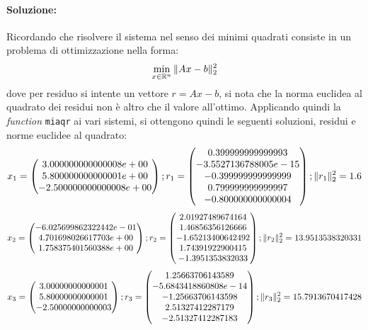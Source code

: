\documentclass[12pt]{article}
\begin{document}
\paragraph{Soluzione:}
Ricordando che risolvere il sistema nel senso dei minimi quadrati consiste in un problema di ottimizzazione nella forma:
$$\min_{x \in \mathbb{R}^n}\Arrowvert Ax-b \Arrowvert_{2}^2$$
dove per residuo si intente un vettore  \(r=Ax-b\), si nota che la norma euclidea al quadrato dei residui non è altro che il valore all'ottimo. 
Applicando quindi la \textit{function} \texttt{miaqr} ai vari sistemi, si ottengono quindi le seguenti soluzioni, residui e norme euclidee al quadrato:
\begin{equation*} x_1=
    \begin{pmatrix}
        3.000000000000008e+00\\
        5.800000000000001e+00\\
        -2.500000000000008e+00
    \end{pmatrix}
    ;  r_1=
    \begin{pmatrix}
        0.399999999999993\\
        -3.5527136788005e-15\\
        -0.399999999999999\\
        0.799999999999997\\
        -0.800000000000004
    \end{pmatrix}
    ;  \Arrowvert r_1 \Arrowvert_{2}^2 = 1.6
\end{equation*}
\begin{equation*} x_2=
    \begin{pmatrix}
        -6.025699862322442e-01\\
        4.701698026617703e+00\\
        1.758375401560388e+00
    \end{pmatrix}
    ;  r_2=
    \begin{pmatrix}
        2.01927489674164\\
        1.46856356126666\\
        -1.65213400642492\\
        1.74391922900415\\
        -1.3951353832033
    \end{pmatrix}
    ;  \Arrowvert r_2 \Arrowvert_{2}^2 = 13.9513538320331 
\end{equation*}
\begin{equation*} x_3=
    \begin{pmatrix}
        3.00000000000001\\
        5.80000000000001\\
        -2.50000000000003
    \end{pmatrix}
    ;  r_3=
    \begin{pmatrix}
        1.25663706143589\\
        -5.6843418860808e-14\\
        -1.25663706143598\\
        2.51327412287179\\
        -2.51327412287183
    \end{pmatrix}
    ;  \Arrowvert r_3 \Arrowvert_{2}^2 = 15.7913670417428
\end{equation*}
\end{document}
